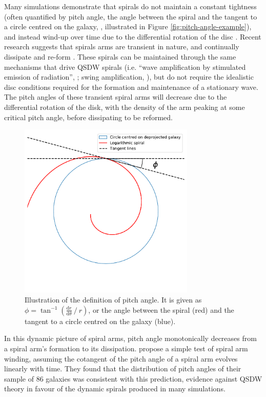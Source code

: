Many simulations demonstrate that spirals do not maintain a constant tightness (often quantified by pitch angle, the angle between the spiral and the tangent to a circle centred on the galaxy, \citealt{1987gady.book.....B}, illustrated in Figure \ref{fig:pitch-angle-example}), and instead wind-up over time due to the differential rotation of the disc \citep{2013ApJ...763...46B}. Recent research suggests that spirals arms are transient in nature, and continually dissipate and re-form \citep{2014PASA...31...35D}. These spirals can be maintained through the same mechanisms that drive QSDW spirals (i.e. ``wave amplification by stimulated emission of radiation'', \citealt{1976ApJ...205..363M}; swing amplification, \citealt{1965MNRAS.130..125G}), but do not require the idealistic disc conditions required for the formation and maintenance of a stationary wave. The pitch angles of these transient spiral arms will decrease due to the differential rotation of the disk, with the density of the arm peaking at some critical pitch angle, before dissipating to be reformed.

\begin{figure}
  \includegraphics[width=8.4cm]{plots/pitch-angle-explanation.pdf}
  \caption{Illustration of the definition of pitch angle. It is given as $\phi = \tan^{-1}\left(\frac{\mathrm{d}r}{\mathrm{d}\theta}\ /\ r\right)$, or the angle between the spiral (red) and the tangent to a circle centred on the galaxy (blue).}
  \label{fig:example-spiral-fits}
\end{figure}
In this dynamic picture of spiral arms, pitch angle monotonically decreases from a spiral arm's formation to its dissipation. \citet{2019arXiv190910291P} propose a simple test of spiral arm winding, assuming the cotangent of the pitch angle of a spiral arm evolves linearly with time. They found that the distribution of pitch angles of their sample of 86 galaxies was consistent with this prediction, evidence against QSDW theory in favour of the dynamic spirals produced in many simulations.

